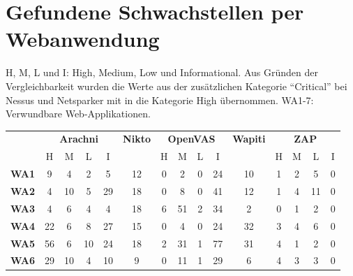 \documentclass[12pt,oneside,a4paper,parskip]{scrbook}
\begin{document}
  \section{Gefundene Schwachstellen per Webanwendung}
   H, M, L und I: High, Medium, Low und Informational. Aus Gründen der Vergleichbarkeit wurden die Werte aus der zusätzlichen Kategorie ``Critical'' bei Nessus und Netsparker mit in die Kategorie High übernommen. WA1-7: Verwundbare Web-Applikationen.
    \begin{table}[H]
      \begin{tabular}{|r|c|c|c|c|c|c|c|c|c|c|c|c|c|c|}
        \cline{2-15}
        \multicolumn{1}{r|}{}       & \multicolumn{4}{c|}{\textbf{Arachni}} & \textbf{Nikto} & \multicolumn{4}{c|}{\textbf{OpenVAS}} & \textbf{Wapiti} & \multicolumn{4}{c|}{\textbf{ZAP}}  \\
        \cline{2-15}
        \multicolumn{1}{r|}{}       & H & M & L & I              &                & H & M & L & I              &                 & H & M & L & I                        \\
        \hline
        \textbf{WA1}      & 9    & 4    & 2   & 5                 & 12             & 0    & 2    & 0   & 24                & 10              & 1    & 2    & 5   & 0                           \\
        \hline
        \textbf{WA2}        & 4    & 10   & 5   & 29                & 18             & 0    & 8    & 0   & 41                & 12              & 1    & 4    & 11  & 0                           \\
        \hline
        \textbf{WA3}          & 4    & 6    & 4   & 4                 & 18             & 6    & 51   & 2   & 34                & 2               & 0    & 1    & 2   & 0                           \\
        \hline
        \textbf{WA4}    & 22   & 6    & 8   & 27                & 15             & 0    & 4    & 0   & 24                & 32              & 3    & 4    & 6   & 0                           \\
        \hline
        \textbf{WA5}             & 56   & 6    & 10  & 24                & 18             & 2    & 31   & 1   & 77                & 31              & 4    & 1    & 2   & 0                           \\
        \hline
        \textbf{WA6}      & 29   & 10   & 4   & 10                & 9              & 0    & 11   & 1   & 29                & 6               & 4    & 3    & 3   & 0                           \\

\end{tabular}
\end{table}
\end{document}
